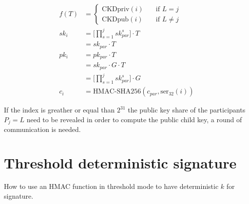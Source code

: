 \begin{equation*}
\begin{split}
  f(T) &=
  \begin{cases}
    \text{CKDpriv}(i) & \quad \text{if } L = j\\%
    \text{CKDpub}(i) & \quad \text{if } L \neq j
  \end{cases} \\
  sk_i &= \Bigg[ \prod_{s=1}^{j} sk_{par}^{s} \Bigg] \cdot T \\
       &= sk_{par} \cdot T \\
  pk_i &= pk_{par} \cdot T \\
       &= sk_{par} \cdot G \cdot T \\
       &= \Bigg[ \prod_{s=1}^{j} sk_{par}^{s} \Bigg] \cdot G \\
  c_i &= \text{HMAC-SHA256}(c_{par}, \text{ser}_{32}(i))
\end{split}
\end{equation*}

If the index is greather or equal than $2^{31}$
the public key share of the participants $P_j = L$ need to be
revealed in order to compute the public child key, a round of communication is
needed.


%


\section{Threshold deterministic signature}

How to use an HMAC function in threshold mode to have deterministic $k$ for signature.
